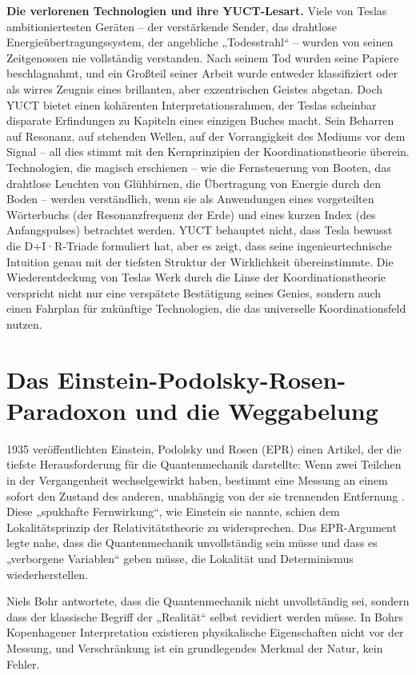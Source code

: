 \documentclass[12pt,a4paper]{article}
\begin{document}
	\textbf{Die verlorenen Technologien und ihre YUCT-Lesart.} Viele von Teslas ambitioniertesten Geräten – der verstärkende Sender, das drahtlose Energieübertragungssystem, der angebliche „Todesstrahl“ – wurden von seinen Zeitgenossen nie vollständig verstanden. Nach seinem Tod wurden seine Papiere beschlagnahmt, und ein Großteil seiner Arbeit wurde entweder klassifiziert oder als wirres Zeugnis eines brillanten, aber exzentrischen Geistes abgetan. Doch YUCT bietet einen kohärenten Interpretationsrahmen, der Teslas scheinbar disparate Erfindungen zu Kapiteln eines einzigen Buches macht. Sein Beharren auf Resonanz, auf stehenden Wellen, auf der Vorrangigkeit des Mediums vor dem Signal – all dies stimmt mit den Kernprinzipien der Koordinationstheorie überein. Technologien, die magisch erschienen – wie die Fernsteuerung von Booten, das drahtlose Leuchten von Glühbirnen, die Übertragung von Energie durch den Boden – werden verständlich, wenn sie als Anwendungen eines vorgeteilten Wörterbuchs (der Resonanzfrequenz der Erde) und eines kurzen Index (des Anfangspulses) betrachtet werden. YUCT behauptet nicht, dass Tesla bewusst die D+I·R-Triade formuliert hat, aber es zeigt, dass seine ingenieurtechnische Intuition genau mit der tiefsten Struktur der Wirklichkeit übereinstimmte. Die Wiederentdeckung von Teslas Werk durch die Linse der Koordinationstheorie verspricht nicht nur eine verspätete Bestätigung seines Genies, sondern auch einen Fahrplan für zukünftige Technologien, die das universelle Koordinationsfeld nutzen.
	
	\section{Das Einstein-Podolsky-Rosen-Paradoxon und die Weggabelung}
	
	1935 veröffentlichten Einstein, Podolsky und Rosen (EPR) einen Artikel, der die tiefste Herausforderung für die Quantenmechanik darstellte: Wenn zwei Teilchen in der Vergangenheit wechselgewirkt haben, bestimmt eine Messung an einem sofort den Zustand des anderen, unabhängig von der sie trennenden Entfernung \cite{EPR1935}. Diese „spukhafte Fernwirkung“, wie Einstein sie nannte, schien dem Lokalitätsprinzip der Relativitätstheorie zu widersprechen. Das EPR-Argument legte nahe, dass die Quantenmechanik unvollständig sein müsse und dass es „verborgene Variablen“ geben müsse, die Lokalität und Determinismus wiederherstellen.
	
	Niels Bohr antwortete, dass die Quantenmechanik nicht unvollständig sei, sondern dass der klassische Begriff der „Realität“ selbst revidiert werden müsse. In Bohrs Kopenhagener Interpretation existieren physikalische Eigenschaften nicht vor der Messung, und Verschränkung ist ein grundlegendes Merkmal der Natur, kein Fehler.
	
\end{document}
